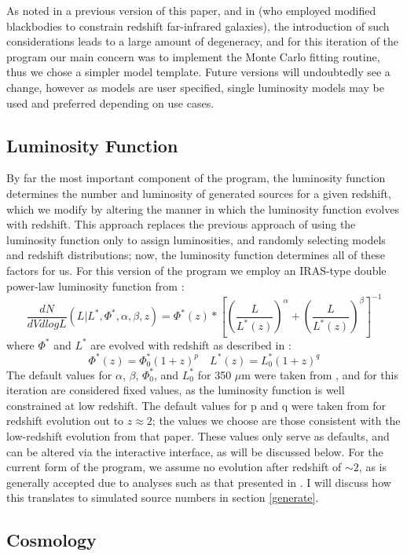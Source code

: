 \documentclass[twocolumn,letterpaper,10pt]{article}
\begin{document}
As noted in a previous version of this paper, and in \citet {wiklind03} (who employed modified blackbodies to constrain redshift far-infrared galaxies), the introduction of such considerations leads to a large amount of degeneracy, and for this iteration of the program our main concern was to implement the Monte Carlo fitting routine, thus we chose a simpler model template. Future versions will undoubtedly see a change, however as models are user specified, single luminosity models may be used and preferred depending on use cases.

\subsection{Luminosity Function}\label{sec:lf}

By far the most important component of the program, the luminosity function determines the number and luminosity of generated sources for a given redshift, which we modify by altering the manner in which the luminosity function evolves with redshift. This approach replaces the previous approach of using the luminosity function only to assign luminosities, and randomly selecting models and redshift distributions; now, the luminosity function determines all of these factors for us. For this version of the program we employ an IRAS-type double power-law luminosity function from \citet{negrello13}:
$$
\frac{dN}{dV dlogL}(L|L^*,\Phi^*,\alpha,\beta,z) = \Phi^*(z)*\left[{\left(\frac{L}{L^*(z)}\right)}^{\alpha}+\left(\frac{L}{L^*(z)}\right)^{\beta}\right]^{-1}
$$
where $\Phi^*$ and $L^*$ are evolved with redshift as described in \citet{Caputi07}:
$$
\Phi^*(z) = \Phi^*_0(1+z)^p \quad
L^*(z) = L^*_0(1+z)^q
$$
The default values for $\alpha$, $\beta$, $\Phi^*_0$, and $L^*_0$ for 350 $\mu$m were taken from \citet{negrello13}, and for this iteration are considered fixed values, as the luminosity function is well constrained at low redshift. The default values for p and q were taken from \citet{Caputi07} for redshift evolution out to $z\approx2$; the values we choose are those consistent with the low-redshift evolution from that paper. These values only serve as defaults, and can be altered via the interactive interface, as will be discussed below. For the current form of the program, we assume no evolution after redshift of $\sim2$, as is generally accepted due to analyses such as that presented in \citet{marsden11}. I will discuss how this translates to simulated source numbers in section \ref{generate}.

\subsection{Cosmology}\label{sec:cosmo}
\end{document}

